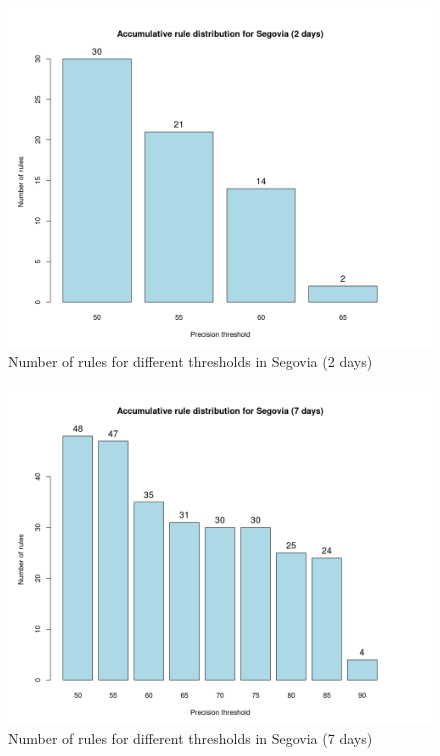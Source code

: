 \documentclass[a4paper,12pt]{article}
\begin{document}
\begin{figure}[hbtp]
\includegraphics[width=\textwidth]{img/precision_seg2.png}
\caption{Number of rules for different thresholds in Segovia (2 days)} \label{fig:precision_seg2}
\end{figure}

\begin{figure}[hbtp]
\includegraphics[width=\textwidth]{img/precision_seg7.png}
\caption{Number of rules for different thresholds in Segovia (7 days)} \label{fig:precision_seg7}
\end{figure}
\end{document}
